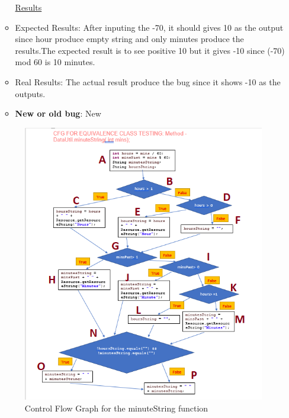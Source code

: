 \documentclass[fontsize=12pt,paper=letter,twoside]{scrartcl}
\begin{document}
\begin{itemize}
\begin{itemize}
 \underline{ Results}
\item Expected Results: After inputing the -70, it should gives 10 as the output since hour produce empty string and only minutes produce the results.The expected result is to see positive 10 but it gives -10 since (-70) mod 60 is 10 minutes.
\item Real Results: The actual result produce the bug since it shows -10 as the outputs.
\item \textbf{New or old bug}: New
\end{itemize}
\begin{figure}[!htb]
\begin{center}
\includegraphics[width=.99\textwidth]{images/wbt/ect/cfg.png}
\end{center}
\caption{Control Flow Graph for the minuteString function}
\label{fig:wbt_ect_cfg}
\end{figure}



\end{itemize}
\end{document}
